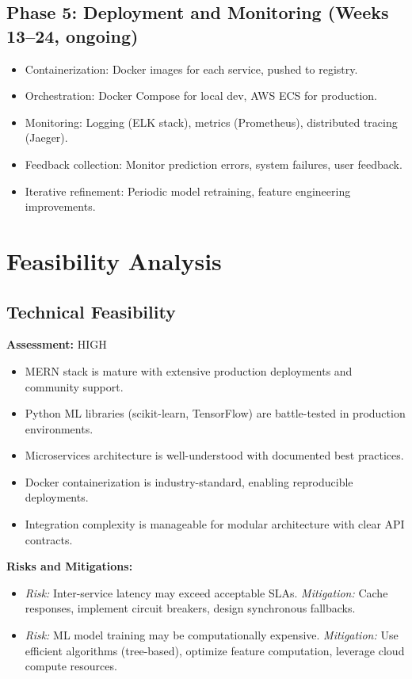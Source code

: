\documentclass[12pt,a4paper]{report}
\begin{document}
\subsection{Phase 5: Deployment and Monitoring (Weeks 13--24, ongoing)}
\begin{itemize}
    \item Containerization: Docker images for each service, pushed to registry.
    \item Orchestration: Docker Compose for local dev, AWS ECS for production.
    \item Monitoring: Logging (ELK stack), metrics (Prometheus), distributed tracing (Jaeger).
    \item Feedback collection: Monitor prediction errors, system failures, user feedback.
    \item Iterative refinement: Periodic model retraining, feature engineering improvements.
\end{itemize}

\section{Feasibility Analysis}

\subsection{Technical Feasibility}

\textbf{Assessment:} HIGH

\begin{itemize}
    \item MERN stack is mature with extensive production deployments and community support.
    \item Python ML libraries (scikit-learn, TensorFlow) are battle-tested in production environments.
    \item Microservices architecture is well-understood with documented best practices.
    \item Docker containerization is industry-standard, enabling reproducible deployments.
    \item Integration complexity is manageable for modular architecture with clear API contracts.
\end{itemize}

\textbf{Risks and Mitigations:}
\begin{itemize}
    \item \textit{Risk:} Inter-service latency may exceed acceptable SLAs. \textit{Mitigation:} Cache responses, implement circuit breakers, design synchronous fallbacks.
    \item \textit{Risk:} ML model training may be computationally expensive. \textit{Mitigation:} Use efficient algorithms (tree-based), optimize feature computation, leverage cloud compute resources.
\end{itemize}
\end{document}
